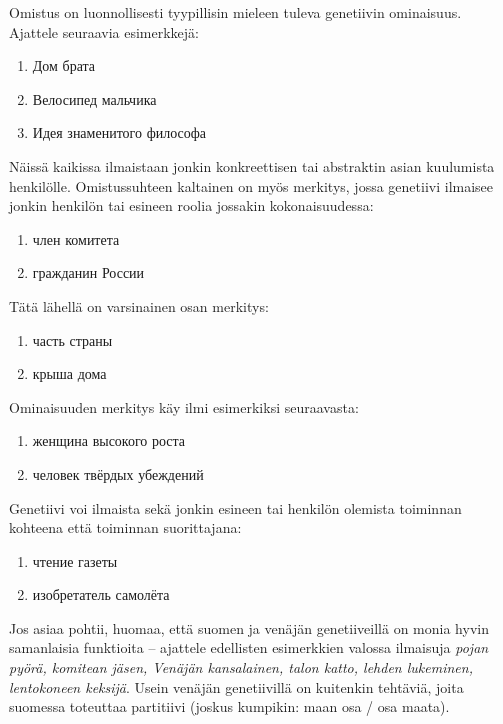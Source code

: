 \documentclass[]{scrreprt}
\providecommand{\tightlist}{%
  \setlength{\itemsep}{0pt}\setlength{\parskip}{0pt}}
\begin{document}
Omistus on luonnollisesti tyypillisin mieleen tuleva genetiivin
ominaisuus. Ajattele seuraavia esimerkkejä:

\begin{enumerate}
\def\labelenumi{(\arabic{enumi})}
\setcounter{enumi}{23}
\tightlist
\item
  Дом брата
\item
  Велосипед мальчика
\item
  Идея знаменитого философа
\end{enumerate}

Näissä kaikissa ilmaistaan jonkin konkreettisen tai abstraktin asian
kuulumista henkilölle. Omistussuhteen kaltainen on myös merkitys, jossa
genetiivi ilmaisee jonkin henkilön tai esineen roolia jossakin
kokonaisuudessa:

\begin{enumerate}
\def\labelenumi{(\arabic{enumi})}
\setcounter{enumi}{26}
\tightlist
\item
  член комитета
\item
  гражданин России
\end{enumerate}

Tätä lähellä on varsinainen osan merkitys:

\begin{enumerate}
\def\labelenumi{(\arabic{enumi})}
\setcounter{enumi}{28}
\tightlist
\item
  часть страны
\item
  крыша дома
\end{enumerate}

Ominaisuuden merkitys käy ilmi esimerkiksi seuraavasta:

\begin{enumerate}
\def\labelenumi{(\arabic{enumi})}
\setcounter{enumi}{30}
\tightlist
\item
  женщина высокого роста
\item
  человек твёрдых убеждений
\end{enumerate}

Genetiivi voi ilmaista sekä jonkin esineen tai henkilön olemista
toiminnan kohteena että toiminnan suorittajana:

\begin{enumerate}
\def\labelenumi{(\arabic{enumi})}
\setcounter{enumi}{32}
\tightlist
\item
  чтение газеты
\item
  изобретатель самолёта
\end{enumerate}

Jos asiaa pohtii, huomaa, että suomen ja venäjän genetiiveillä on monia
hyvin samanlaisia funktioita -- ajattele edellisten esimerkkien valossa
ilmaisuja \emph{pojan pyörä, komitean jäsen, Venäjän kansalainen, talon
katto, lehden lukeminen, lentokoneen keksijä}. Usein venäjän
genetiivillä on kuitenkin tehtäviä, joita suomessa toteuttaa partitiivi
(joskus kumpikin: maan osa / osa maata).
\end{document}
